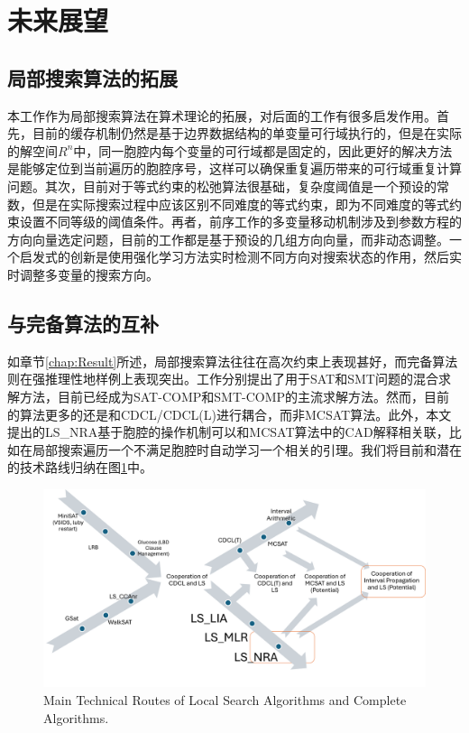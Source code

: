 \section{未来展望}
\subsection{局部搜索算法的拓展}
本工作作为局部搜索算法在算术理论的拓展，对后面的工作有很多启发作用。首先，目前的缓存机制仍然是基于边界数据结构的单变量可行域执行的，但是在实际的解空间$R^n$中，同一胞腔内每个变量的可行域都是固定的，因此更好的解决方法是能够定位到当前遍历的胞腔序号，这样可以确保重复遍历带来的可行域重复计算问题。其次，目前对于等式约束的松弛算法很基础，复杂度阈值是一个预设的常数，但是在实际搜索过程中应该区别不同难度的等式约束，即为不同难度的等式约束设置不同等级的阈值条件。再者，前序工作的多变量移动机制涉及到参数方程的方向向量选定问题，目前的工作都是基于预设的几组方向向量，而非动态调整。一个启发式的创新是使用强化学习方法实时检测不同方向对搜索状态的作用，然后实时调整多变量的搜索方向。

\subsection{与完备算法的互补}
如章节\ref{chap:Result}所述，局部搜索算法往往在高次约束上表现甚好，而完备算法则在强推理性地样例上表现突出。工作\cite{CaiZ21,hybridSMT}分别提出了用于SAT和SMT问题的混合求解方法，目前已经成为SAT-COMP和SMT-COMP的主流求解方法。然而，目前的算法更多的还是和CDCL/CDCL(L)进行耦合，而非MCSAT算法。此外，本文提出的LS\_NRA基于胞腔的操作机制可以和MCSAT算法中的CAD解释相关联，比如在局部搜索遍历一个不满足胞腔时自动学习一个相关的引理。我们将目前和潜在的技术路线归纳在图\ref{fig:future}中。

\begin{figure}[t]
    \centering
    \includegraphics[width=\columnwidth]{Img/future.png}
     {Main Technical Routes of Local Search Algorithms and Complete Algorithms.}
\label{fig:future}
\end{figure}

\clearpage